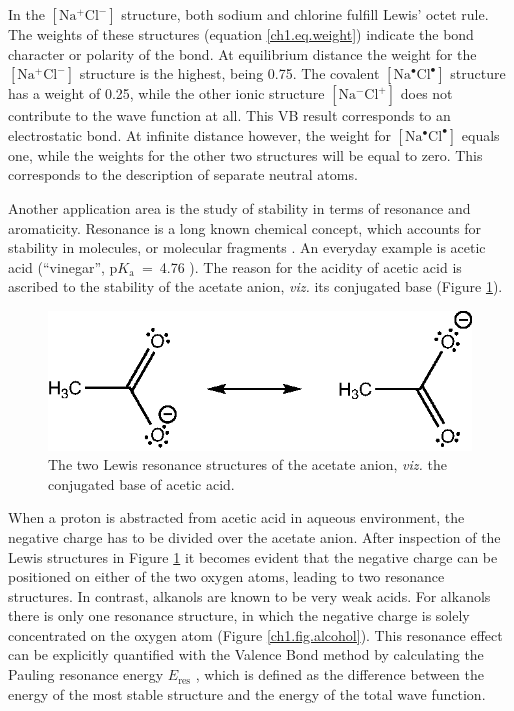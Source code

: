 In the $\mathrm{[Na^{+} Cl^{-}]}$ structure, both sodium and chlorine fulfill Lewis' octet rule. The weights of these structures (equation \ref{ch1.eq.weight}) indicate the bond character or polarity of the bond. At equilibrium distance the weight for the $\mathrm{[Na^{+} Cl^{-}]}$ structure is the highest, being 0.75. The covalent $\mathrm{[Na^\bullet Cl^\bullet]}$ structure has a weight of 0.25, while the other ionic structure $\mathrm{[Na^{-} Cl^{+}]}$ does not contribute to the wave function at all. This VB result corresponds to an electrostatic bond. At infinite distance however, the weight for \mbox{$\mathrm{[Na^\bullet Cl^\bullet]}$} equals one, while the weights for the other two structures will be equal to zero. This corresponds to the description of separate neutral atoms.

Another application area is the study of stability in terms of resonance and aromaticity. Resonance is a long known chemical concept, which accounts for stability in molecules, or molecular fragments \cite{whelandbook}. An everyday example is acetic acid (``vinegar'', p$K_\mathrm{a}$~=~4.76 \cite{bruice}). The reason for the acidity of acetic acid is ascribed to the stability of the acetate anion, \textit{viz.} its conjugated base (Figure \ref{ch1.fig.acetic}).
\begin{figure}[ht]
\center
\includegraphics{introduction/figures/acetic.eps}
\caption{The two Lewis resonance structures of the acetate anion, \textit{viz.} the conjugated base of acetic acid.}
\label{ch1.fig.acetic}
\end{figure}
When a proton is abstracted from acetic acid in aqueous environment, the negative charge has to be divided over the acetate anion. After inspection of the Lewis structures in Figure \ref{ch1.fig.acetic} it becomes evident that the negative charge can be positioned on either of the two oxygen atoms, leading to two resonance structures. In contrast, alkanols are known to be very weak acids. For alkanols there is only one resonance structure, in which the negative charge is solely concentrated on the oxygen atom (Figure \ref{ch1.fig.alcohol}). This resonance effect can be explicitly quantified with the Valence Bond method by calculating the Pauling resonance energy $E_\mathrm{res}$ \cite{paulingbook}, which is defined as the difference between the energy of the most stable structure and the energy of the total wave function. 
